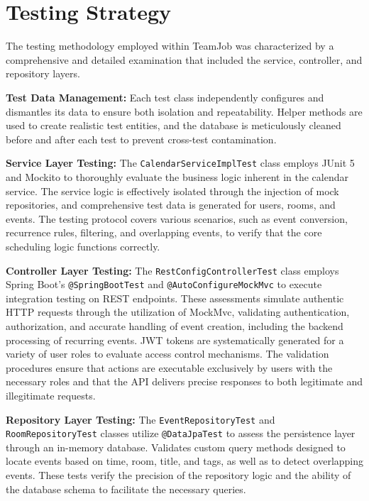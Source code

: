 \section{Testing Strategy}\label{sec:testing-strategy}
The testing methodology employed within TeamJob was characterized by a comprehensive and detailed examination that included the service, controller, and repository layers.

\textbf{Test Data Management:} Each test class independently configures and dismantles its data to ensure both isolation and repeatability.
Helper methods are used to create realistic test entities, and the database is meticulously cleaned before and after each test to prevent cross-test contamination.

\textbf{Service Layer Testing:} The \texttt{CalendarServiceImplTest} class employs JUnit 5 and Mockito to thoroughly evaluate the business logic inherent in the calendar service.
The service logic is effectively isolated through the injection of mock repositories, and comprehensive test data is generated for users, rooms, and events.
The testing protocol covers various scenarios, such as event conversion, recurrence rules, filtering, and overlapping events, to verify that the core scheduling logic functions correctly.

\textbf{Controller Layer Testing:} The \texttt{RestConfigControllerTest} class employs Spring Boot's \texttt{@SpringBootTest} and \texttt{@AutoConfigureMockMvc} to execute integration testing on REST endpoints.
These assessments simulate authentic HTTP requests through the utilization of MockMvc, validating authentication, authorization, and accurate handling of event creation, including the backend processing of recurring events.
JWT tokens are systematically generated for a variety of user roles to evaluate access control mechanisms.
The validation procedures ensure that actions are executable exclusively by users with the necessary roles and that the API delivers precise responses to both legitimate and illegitimate requests.

\textbf{Repository Layer Testing:} The \texttt{EventRepositoryTest} and \texttt{RoomRepositoryTest} classes utilize \texttt{@DataJpaTest} to assess the persistence layer through an in-memory database.
Validates custom query methods designed to locate events based on time, room, title, and tags, as well as to detect overlapping events.
These tests verify the precision of the repository logic and the ability of the database schema to facilitate the necessary queries.

